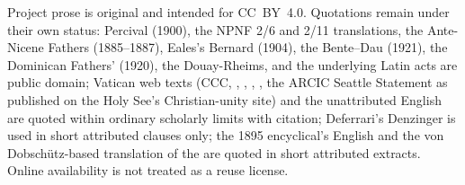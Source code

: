 Project prose is original and intended for CC~BY~4.0. Quotations remain
under their own status: Percival (1900), the NPNF 2/6 and 2/11
translations, the Ante-Nicene Fathers (1885--1887), Eales's Bernard
(1904), the Bente--Dau  (1921), the Dominican
Fathers'  (1920), the Douay-Rheims, and the underlying Latin
acts are public domain; Vatican web texts (CCC, ,
, ,
, the ARCIC Seattle Statement as published on
the Holy See's Christian-unity site) and the unattributed
 English are quoted within ordinary scholarly
limits with citation; Deferrari's Denzinger is used in short attributed
clauses only; the 1895 encyclical's English and the von Dobsch\"utz-based
translation of the  are quoted in short
attributed extracts. Online availability is not treated as a reuse
license.
